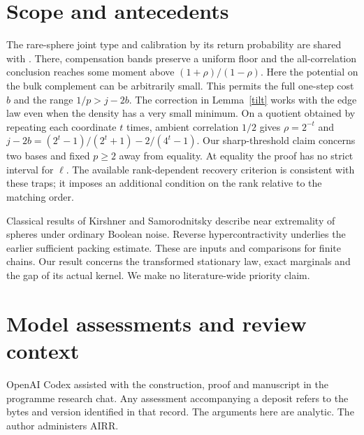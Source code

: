 \documentclass[11pt]{article}
\begin{document}
\section{Scope and antecedents}
The rare-sphere joint type and calibration by its return probability are shared with \cite{shell}. There, compensation bands preserve a uniform floor and the all-correlation conclusion reaches some moment above $(1+\rho)/(1-\rho)$. Here the potential on the bulk complement can be arbitrarily small. This permits the full one-step cost $b$ and the range $1/p>j-2b$. The correction in Lemma~\ref{tilt} works with the edge law even when the density has a very small minimum. On a quotient obtained by repeating each coordinate $t$ times, ambient correlation $1/2$ gives $\rho=2^{-t}$ and $j-2b=(2^t-1)/(2^t+1)-2/(4^t-1)$. Our sharp-threshold claim concerns two bases and fixed $p\ge2$ away from equality. At equality the proof has no strict interval for $\ell$. The available rank-dependent recovery criterion \cite{enumerator} is consistent with these traps; it imposes an additional condition on the rank relative to the matching order.

Classical results of Kirshner and Samorodnitsky \cite{ks} describe near extremality of spheres under ordinary Boolean noise. Reverse hypercontractivity \cite{mos} underlies the earlier sufficient packing estimate. These are inputs and comparisons for finite chains. Our result concerns the transformed stationary law, exact marginals and the gap of its actual kernel. We make no literature-wide priority claim.

\section*{Model assessments and review context}
OpenAI Codex assisted with the construction, proof and manuscript in the programme research chat. Any assessment accompanying a deposit refers to the bytes and version identified in that record. The arguments here are analytic. The author administers AIRR.
\end{document}
